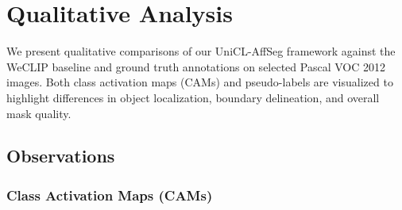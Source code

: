 \section{Qualitative Analysis}
\label{sec:qualitative_analysis}

We present qualitative comparisons of our UniCL-AffSeg framework against the WeCLIP baseline and ground truth annotations on selected Pascal VOC 2012 images. Both class activation maps (CAMs) and pseudo-labels are visualized to highlight differences in object localization, boundary delineation, and overall mask quality.




\subsection{Observations}

\subsubsection{Class Activation Maps (CAMs)}


